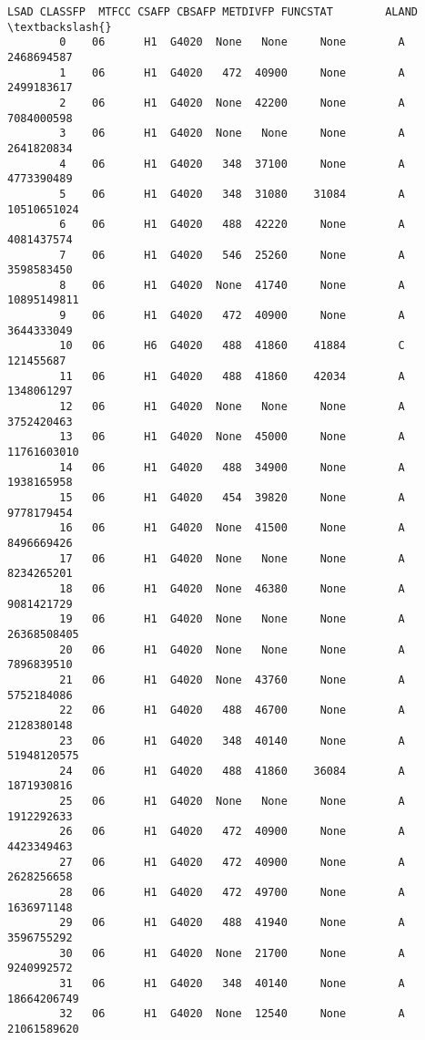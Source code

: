 \documentclass[11pt]{article}
\begin{document}
\begin{Verbatim}[commandchars=\\\{\}]
           LSAD CLASSFP  MTFCC CSAFP CBSAFP METDIVFP FUNCSTAT        ALAND  \textbackslash{}
        0    06      H1  G4020  None   None     None        A   2468694587   
        1    06      H1  G4020   472  40900     None        A   2499183617   
        2    06      H1  G4020  None  42200     None        A   7084000598   
        3    06      H1  G4020  None   None     None        A   2641820834   
        4    06      H1  G4020   348  37100     None        A   4773390489   
        5    06      H1  G4020   348  31080    31084        A  10510651024   
        6    06      H1  G4020   488  42220     None        A   4081437574   
        7    06      H1  G4020   546  25260     None        A   3598583450   
        8    06      H1  G4020  None  41740     None        A  10895149811   
        9    06      H1  G4020   472  40900     None        A   3644333049   
        10   06      H6  G4020   488  41860    41884        C    121455687   
        11   06      H1  G4020   488  41860    42034        A   1348061297   
        12   06      H1  G4020  None   None     None        A   3752420463   
        13   06      H1  G4020  None  45000     None        A  11761603010   
        14   06      H1  G4020   488  34900     None        A   1938165958   
        15   06      H1  G4020   454  39820     None        A   9778179454   
        16   06      H1  G4020  None  41500     None        A   8496669426   
        17   06      H1  G4020  None   None     None        A   8234265201   
        18   06      H1  G4020  None  46380     None        A   9081421729   
        19   06      H1  G4020  None   None     None        A  26368508405   
        20   06      H1  G4020  None   None     None        A   7896839510   
        21   06      H1  G4020  None  43760     None        A   5752184086   
        22   06      H1  G4020   488  46700     None        A   2128380148   
        23   06      H1  G4020   348  40140     None        A  51948120575   
        24   06      H1  G4020   488  41860    36084        A   1871930816   
        25   06      H1  G4020  None   None     None        A   1912292633   
        26   06      H1  G4020   472  40900     None        A   4423349463   
        27   06      H1  G4020   472  40900     None        A   2628256658   
        28   06      H1  G4020   472  49700     None        A   1636971148   
        29   06      H1  G4020   488  41940     None        A   3596755292   
        30   06      H1  G4020  None  21700     None        A   9240992572   
        31   06      H1  G4020   348  40140     None        A  18664206749   
        32   06      H1  G4020  None  12540     None        A  21061589620   

\end{Verbatim}
\end{document}
